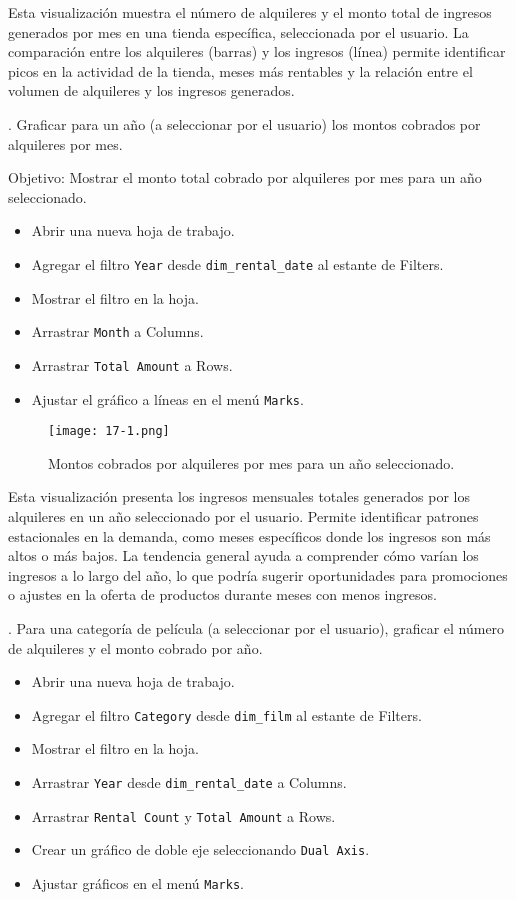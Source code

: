 \documentclass{article}
\begin{document}
Esta visualización muestra el número de alquileres y el monto total de ingresos generados por mes en una tienda específica, seleccionada por el usuario. La comparación entre los alquileres (barras) y los ingresos (línea) permite identificar picos en la actividad de la tienda, meses más rentables y la relación entre el volumen de alquileres y los ingresos generados. 

. Graficar para un año (a seleccionar por el usuario) los montos cobrados por alquileres por mes.

Objetivo: Mostrar el monto total cobrado por alquileres por mes para un año seleccionado.

\begin{itemize}
    \item Abrir una nueva hoja de trabajo.
    \item Agregar el filtro \texttt{Year} desde \texttt{dim\_rental\_date} al estante de Filters.
    \item Mostrar el filtro en la hoja.
    \item Arrastrar \texttt{Month} a Columns.
    \item Arrastrar \texttt{Total Amount} a Rows.
    \item Ajustar el gráfico a líneas en el menú \texttt{Marks}.
\end{itemize}

\begin{figure}[h]
    \centering
    \texttt{[image: 17-1.png]} %
    \caption{Montos cobrados por alquileres por mes para un año seleccionado.}
    \label{fig:alquileres-año}
\end{figure}

Esta visualización presenta los ingresos mensuales totales generados por los alquileres en un año seleccionado por el usuario. Permite identificar patrones estacionales en la demanda, como meses específicos donde los ingresos son más altos o más bajos. La tendencia general ayuda a comprender cómo varían los ingresos a lo largo del año, lo que podría sugerir oportunidades para promociones o ajustes en la oferta de productos durante meses con menos ingresos.

. Para una categoría de película (a seleccionar por el usuario), graficar el número de alquileres y el monto cobrado por año.

\begin{itemize}
    \item Abrir una nueva hoja de trabajo.
    \item Agregar el filtro \texttt{Category} desde \texttt{dim\_film} al estante de Filters.
    \item Mostrar el filtro en la hoja.
    \item Arrastrar \texttt{Year} desde \texttt{dim\_rental\_date} a Columns.
    \item Arrastrar \texttt{Rental Count} y \texttt{Total Amount} a Rows.
    \item Crear un gráfico de doble eje seleccionando \texttt{Dual Axis}.
    \item Ajustar gráficos en el menú \texttt{Marks}.
\end{itemize}
\end{document}
